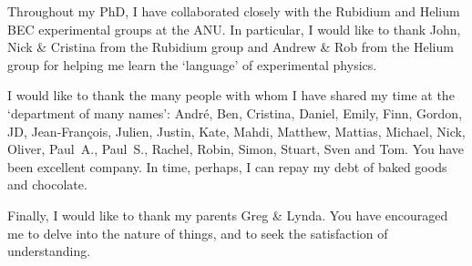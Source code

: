 Throughout my PhD, I have collaborated closely with the Rubidium and Helium BEC experimental groups at the ANU.  In particular, I would like to thank John, Nick \& Cristina from the Rubidium group and Andrew \& Rob from the Helium group for helping me learn the `language' of experimental physics.

I would like to thank the many people with whom I have shared my time at the `department of many names': André, Ben, Cristina, Daniel, Emily, Finn, Gordon, JD, Jean-François, Julien, Justin, Kate, Mahdi, Matthew, Mattias, Michael, Nick, Oliver, Paul~A., Paul~S., Rachel, Robin, Simon, Stuart, Sven and Tom.  You have been excellent company.  In time, perhaps, I can repay my debt of baked goods and chocolate.

Finally, I would like to thank my parents Greg \& Lynda.  You have encouraged me to delve into the nature of things, and to seek the satisfaction of understanding.
